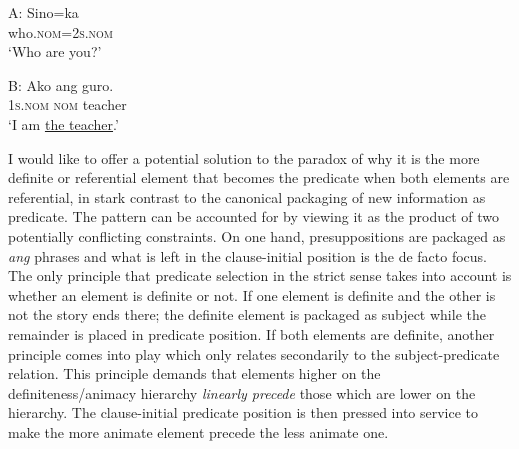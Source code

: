 \documentclass[output=paper]{langsci/langscibook}
\begin{document}
\begin{exe}
\label{e:kaufman:68}
		\ex\label{e:kaufman:68a}\gll A: Sino=ka{\USQMark}\\
		\phantom{A:} who.\textsc{nom=2s.nom}\\
		\glt `Who are you?'
		
		\label{e:kaufman:68b}\gll B: Ako ang guro.\\
		\phantom{B:} \textsc{1s.nom} \textsc{nom} teacher\\
		\glt `I am \uline{the teacher}.'
\end{exe}

\noindent
I would like to offer a potential solution to the paradox of why it is the more definite or referential element that becomes the predicate when both elements are referential, in stark contrast to the canonical packaging of new information as predicate. The pattern can be accounted for by viewing it as the product of two potentially conflicting constraints. On one hand, presuppositions are packaged as \textit{ang} phrases and what is left in the clause-initial position is the de facto focus. The only principle that predicate selection in the strict sense takes into account is whether an element is definite or not. If one element is definite and the other is not the story ends there; the definite element is packaged as subject while the remainder is placed in predicate position. If both elements are definite, another principle comes into play which only relates secondarily to the subject-predicate relation. This principle demands that elements higher on the definiteness/animacy hierarchy \emph{linearly precede} those which are lower on the hierarchy. The clause-initial predicate position is then pressed into service to make the more animate element precede the less animate one.
\end{document}
